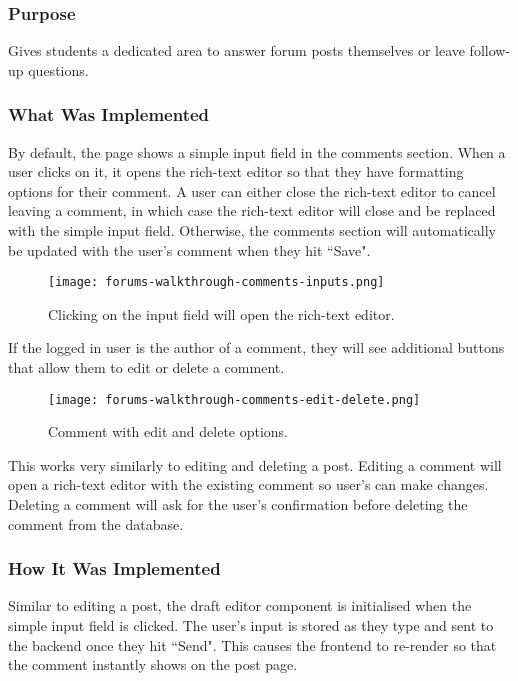 \subsubsection{Purpose}
Gives students a dedicated area to answer forum posts themselves or leave follow-up questions.

\subsubsection{What Was Implemented}
By default, the page shows a simple input field in the comments section.
When a user clicks on it, it opens the rich-text editor so that they have formatting options for their comment.
A user can either close the rich-text editor to cancel leaving a comment, in which case the rich-text editor will close and be replaced with the simple input field.
Otherwise, the comments section will automatically be updated with the user's comment when they hit ``Save".

\begin{figure}[h!]
    \texttt{[image: forums-walkthrough-comments-inputs.png]}
    \centering
    \caption{Clicking on the input field will open the rich-text editor.}
\end{figure}

If the logged in user is the author of a comment, they will see additional buttons that allow them to edit or delete a comment.

\begin{figure}[h!]
    \texttt{[image: forums-walkthrough-comments-edit-delete.png]}
    \centering
    \caption{Comment with edit and delete options.}
\end{figure}

This works very similarly to editing and deleting a post.
Editing a comment will open a rich-text editor with the existing comment so user's can make changes.
Deleting a comment will ask for the user's confirmation before deleting the comment from the database.

\subsubsection{How It Was Implemented}
Similar to editing a post, the draft editor component is initialised when the simple input field is clicked.
The user's input is stored as they type and sent to the backend once they hit ``Send".
This causes the frontend to re-render so that the comment instantly shows on the post page.

